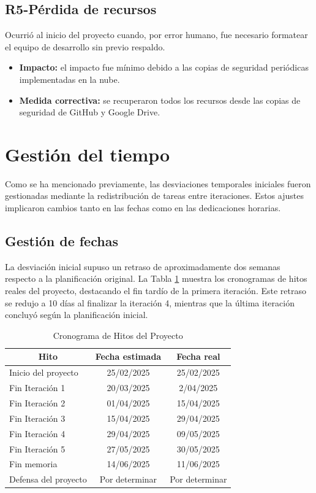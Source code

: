   \subsection{R5-Pérdida de recursos}
  Ocurrió al inicio del proyecto cuando, por error humano, fue necesario formatear el equipo de desarrollo sin previo respaldo.
  \begin{itemize}
  \item\textbf{Impacto: }el impacto fue mínimo debido a las copias de seguridad periódicas implementadas en la nube.
\item\textbf{Medida correctiva: }se recuperaron todos los recursos desde las copias de seguridad de GitHub y Google Drive.
\end{itemize}

\section{Gestión del tiempo}
Como se ha mencionado previamente, las desviaciones temporales iniciales fueron gestionadas mediante la redistribución de tareas entre iteraciones. Estos ajustes implicaron cambios tanto en las fechas como en las dedicaciones horarias.

\subsection{Gestión de fechas}
La desviación inicial supuso un retraso de aproximadamente dos semanas respecto a la planificación original. La Tabla \ref{tab:hitos_real} muestra los cronogramas de hitos reales del proyecto, destacando el fin tardío de la primera iteración. Este retraso se redujo a 10 días al finalizar la iteración 4, mientras que la última iteración concluyó según la planificación inicial.

\begin{table}[H]\centering
\begin{tabular}{|l|c|c|}
\hline
\multicolumn{1}{|c|}{\textbf{Hito}} & \multicolumn{1}{c|}{\textbf{Fecha estimada}} & \multicolumn{1}{c|}{\textbf{Fecha real}} \\
\hline
Inicio del proyecto & 25/02/2025 & 25/02/2025 \\
\hline
Fin Iteración 1 & 20/03/2025 & 2/04/2025 \\
\hline
Fin Iteración 2 & 01/04/2025 & 15/04/2025 \\
\hline
Fin Iteración 3 & 15/04/2025 & 29/04/2025 \\
\hline
Fin Iteración 4 & 29/04/2025 & 09/05/2025 \\
\hline
Fin Iteración 5 & 27/05/2025 & 30/05/2025 \\
\hline
Fin memoria & 14/06/2025 & 11/06/2025 \\
\hline
Defensa del proyecto & Por determinar & Por determinar \\
\hline
\end{tabular}
\caption{Cronograma de Hitos del Proyecto}
\label{tab:hitos_real}
\end{table}

